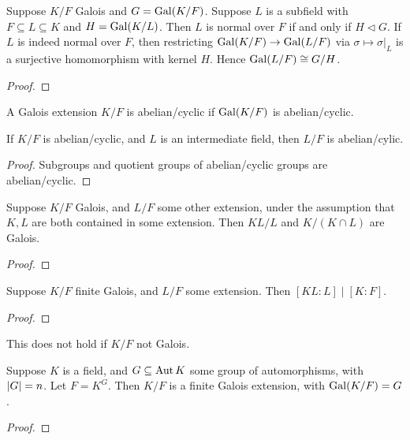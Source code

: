 \begin{theorem}
    Suppose \(K/F\) Galois and \(G = \operatorname{Gal}(K/F)\).
    Suppose \(L\) is a subfield with \(F \subseteq L \subseteq K\) and \(H = \operatorname{Gal}(K/L)\).
    Then \(L\) is normal over \(F\) if and only if \(H \lhd G\).
    If \(L\) is indeed normal over \(F\),
    then restricting \(\operatorname{Gal}(K/F) \to \operatorname{Gal}(L/F)\) via \(\sigma \mapsto \sigma\vert_L\)
    is a surjective homomorphism with kernel \(H\).
    Hence \(\operatorname{Gal}(L/F) \cong G/H\).
\end{theorem}
\begin{proof}
\end{proof}

\begin{definition}
    A Galois extension \(K/F\) is abelian/cyclic
    if \(\operatorname{Gal}(K/F)\) is abelian/cyclic.
\end{definition}
\begin{proposition}
    If \(K/F\) is abelian/cyclic, and \(L\) is an intermediate field,
    then \(L/F\) is abelian/cylic.
\end{proposition}
\begin{proof}
    Subgroups and quotient groups of abelian/cyclic groups are abelian/cyclic.
\end{proof}

\begin{theorem}
    Suppose \(K/F\) Galois, and \(L/F\) some other extension,
    under the assumption that \(K,L\) are both contained in some extension.
    Then \(KL/L\) and \(K/(K \cap L)\) are Galois.
\end{theorem}
\begin{proof}
\end{proof}
\begin{corollary}
    Suppose \(K/F\) finite Galois, and \(L/F\) some extension.
    Then \([KL:L] \mid [K:F]\).
\end{corollary}
\begin{proof}
\end{proof}
\begin{remark}
    This does not hold if \(K/F\) not Galois.
\end{remark}

\begin{theorem}
    Suppose \(K\) is a field, and \(G \subseteq \operatorname{Aut} K\) some group of automorphisms,
    with \(\abs{G} = n\).
    Let \(F = K^G\).
    Then \(K/F\) is a finite Galois extension, with \(\operatorname{Gal}(K/F) = G\).
\end{theorem}
\begin{proof}
\end{proof}

